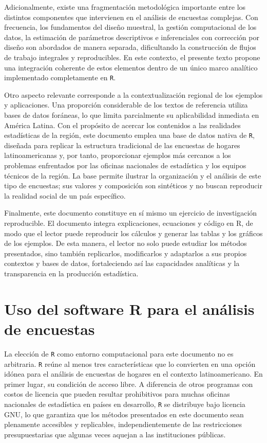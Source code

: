 \documentclass[
  spanish,
  11pt,
  letterpaper,
  oneside,
  open=any]{scrbook}
\begin{document}
Adicionalmente, existe una fragmentación metodológica importante entre
los distintos componentes que intervienen en el análisis de encuestas
complejas. Con frecuencia, los fundamentos del diseño muestral, la
gestión computacional de los datos, la estimación de parámetros
descriptivos e inferenciales con corrección por diseño son abordados de
manera separada, dificultando la construcción de flujos de trabajo
integrales y reproducibles. En este contexto, el presente texto propone
una integración coherente de estos elementos dentro de un único marco
analítico implementado completamente en \texttt{R}.

Otro aspecto relevante corresponde a la contextualización regional de
los ejemplos y aplicaciones. Una proporción considerable de los textos
de referencia utiliza bases de datos foráneas, lo que limita
parcialmente su aplicabilidad inmediata en América Latina. Con el
propósito de acercar los contenidos a las realidades estadísticas de la
región, este documento emplea una base de datos nativa de \texttt{R},
diseñada para replicar la estructura tradicional de las encuestas de
hogares latinoamericanas y, por tanto, proporcionar ejemplos más
cercanos a los problemas enfrentados por las oficinas nacionales de
estadística y los equipos técnicos de la región. La base permite
ilustrar la organización y el análisis de este tipo de encuestas; sus
valores y composición son sintéticos y no buscan reproducir la realidad
social de un país específico.

Finalmente, este documento constituye en sí mismo un ejercicio de
investigación reproducible. El documento integra explicaciones,
ecuaciones y código en R, de modo que el lector puede reproducir los
cálculos y generar las tablas y los gráficos de los ejemplos. De esta
manera, el lector no solo puede estudiar los métodos presentados, sino
también replicarlos, modificarlos y adaptarlos a sus propios contextos y
bases de datos, fortaleciendo así las capacidades analíticas y la
transparencia en la producción estadística.

\section{Uso del software R para el análisis de
encuestas}\label{uso-del-software-r-para-el-analisis-de-encuestas}

La elección de \texttt{R} como entorno computacional para este documento
no es arbitraria. \texttt{R} reúne al menos tres características que lo
convierten en una opción idónea para el análisis de encuestas de hogares
en el contexto latinoamericano. En primer lugar, su condición de acceso
libre. A diferencia de otros programas con costos de licencia que pueden
resultar prohibitivos para muchas oficinas nacionales de estadística en
países en desarrollo, \texttt{R} se distribuye bajo licencia GNU, lo que
garantiza que los métodos presentados en este documento sean plenamente
accesibles y replicables, independientemente de las restricciones
presupuestarias que algunas veces aquejan a las instituciones públicas.
\end{document}
